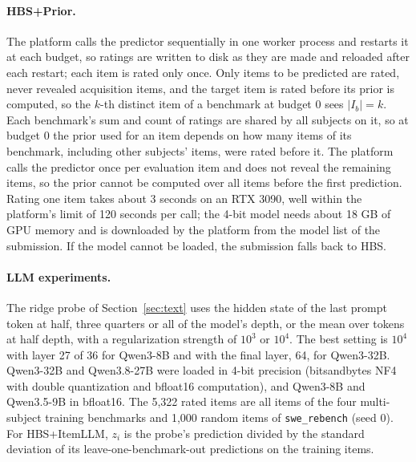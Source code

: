 \documentclass{article}
\newcommand{\bench}[1]{\texttt{#1}}
\begin{document}
\paragraph{HBS+Prior.} The platform calls the predictor sequentially in one worker process and restarts it at each budget, so ratings are written to disk as they are made and reloaded after each restart; each item is rated only once. Only items to be predicted are rated, never revealed acquisition items, and the target item is rated before its prior is computed, so the $k$-th distinct item of a benchmark at budget 0 sees $|I_b| = k$. Each benchmark's sum and count of ratings are shared by all subjects on it, so at budget 0 the prior used for an item depends on how many items of its benchmark, including other subjects' items, were rated before it. The platform calls the predictor once per evaluation item and does not reveal the remaining items, so the prior cannot be computed over all items before the first prediction. Rating one item takes about 3 seconds on an RTX 3090, well within the platform's limit of 120 seconds per call; the 4-bit model needs about 18 GB of GPU memory and is downloaded by the platform from the model list of the submission. If the model cannot be loaded, the submission falls back to HBS.

\paragraph{LLM experiments.} The ridge probe of Section~\ref{sec:text} uses the hidden state of the last prompt token at half, three quarters or all of the model's depth, or the mean over tokens at half depth, with a regularization strength of $10^3$ or $10^4$. The best setting is $10^4$ with layer 27 of 36 for Qwen3-8B and with the final layer, 64, for Qwen3-32B. Qwen3-32B and Qwen3.8-27B were loaded in 4-bit precision (bitsandbytes NF4 with double quantization and bfloat16 computation), and Qwen3-8B and Qwen3.5-9B in bfloat16. The 5,322 rated items are all items of the four multi-subject training benchmarks and 1,000 random items of \bench{swe\_rebench} (seed 0). For HBS+ItemLLM, $z_i$ is the probe's prediction divided by the standard deviation of its leave-one-benchmark-out predictions on the training items.
\end{document}
